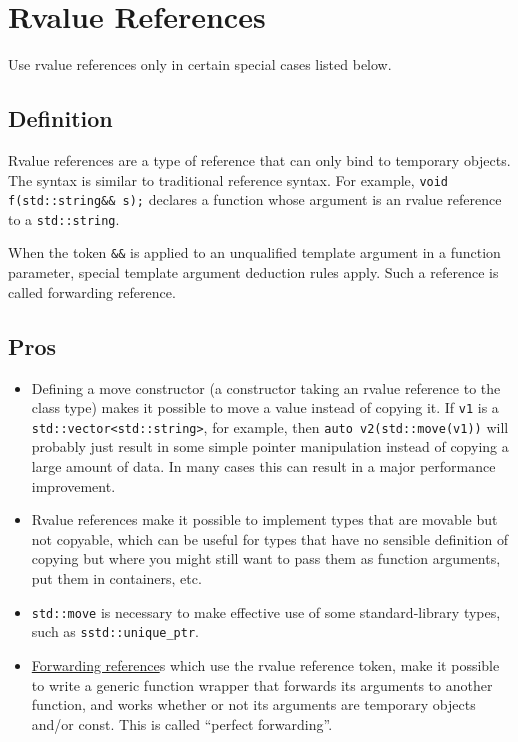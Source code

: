 
\section{Rvalue References}\label{sec:rvalue-references}
Use rvalue references only in certain special cases listed below.

\subsection{Definition}
Rvalue references are a type of reference that can only bind to temporary objects. The syntax is similar to traditional reference syntax. For example, \texttt{void f(std::string&& s);} declares a function whose argument is an rvalue reference to a \texttt{std::string}.

When the token \texttt{&&} is applied to an unqualified template argument in a function parameter, special template argument deduction rules apply. Such a reference is called forwarding reference\label{definition:forwaring-reference}.

\subsection{Pros}
\begin{itemize}
    \item Defining a move constructor (a constructor taking an rvalue reference to the class type) makes it possible to move a value instead of copying it. If \texttt{v1} is a \texttt{std::vector<std::string>}, for example, then \texttt{auto v2(std::move(v1))} will probably just result in some simple pointer manipulation instead of copying a large amount of data. In many cases this can result in a major performance improvement.
    \item Rvalue references make it possible to implement types that are movable but not copyable, which can be useful for types that have no sensible definition of copying but where you might still want to pass them as function arguments, put them in containers, etc.
    \item \texttt{std::move} is necessary to make effective use of some standard-library types, such as \texttt{sstd::unique_ptr}.
    \item \hyperref[definition:forwaring-reference]{Forwarding reference}s which use the rvalue reference token, make it possible to write a generic function wrapper that forwards its arguments to another function, and works whether or not its arguments are temporary objects and/or const. This is called \enquote{perfect forwarding}.
\end{itemize}

